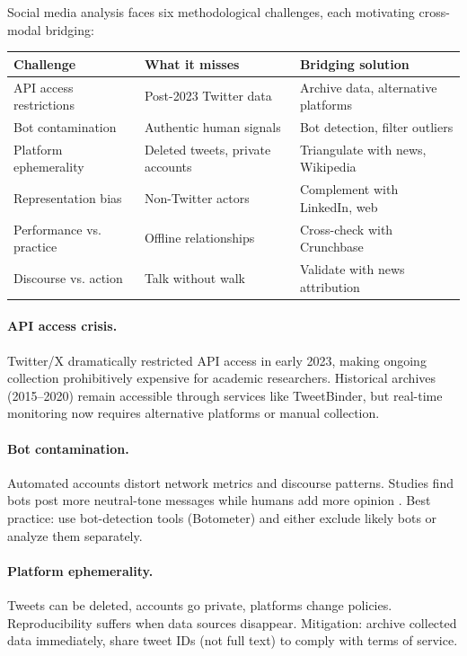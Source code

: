 \documentclass[../main.tex]{subfiles}
\begin{document}
Social media analysis faces six methodological challenges,
each motivating cross-modal bridging:

\tableminimal
\begin{center}
\begin{tabular}{@{}p{3cm}p{4cm}p{4cm}@{}}
\toprule
\textbf{Challenge} & \textbf{What it misses} & \textbf{Bridging solution} \\
\midrule
API access restrictions & Post-2023 Twitter data & Archive data, alternative platforms \\
Bot contamination & Authentic human signals & Bot detection, filter outliers \\
Platform ephemerality & Deleted tweets, private accounts & Triangulate with news, Wikipedia \\
Representation bias & Non-Twitter actors & Complement with LinkedIn, web \\
Performance vs. practice & Offline relationships & Cross-check with Crunchbase \\
Discourse vs. action & Talk without walk & Validate with news attribution \\
\bottomrule
\end{tabular}
\end{center}

\paragraph{API access crisis.}
Twitter/X dramatically restricted API access in early 2023, making ongoing
collection prohibitively expensive for academic researchers.
Historical archives (2015--2020) remain accessible through services like
TweetBinder, but real-time monitoring now requires alternative platforms
or manual collection.

\paragraph{Bot contamination.}
Automated accounts distort network metrics and discourse patterns.
Studies find bots post more neutral-tone messages while humans add more
opinion \parencite{sustainability2024bots}.
Best practice: use bot-detection tools (Botometer) and either exclude
likely bots or analyze them separately.

\paragraph{Platform ephemerality.}
Tweets can be deleted, accounts go private, platforms change policies.
Reproducibility suffers when data sources disappear.
Mitigation: archive collected data immediately, share tweet IDs (not
full text) to comply with terms of service.
\end{document}
